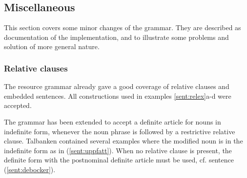 \documentclass{report}
\begin{document}
%


\subsection{Miscellaneous}
This section covers some minor changes of the grammar.
They are described
as documentation of the implementation, and to illustrate some problems
and solution of more general nature.
\subsubsection{Relative clauses}
The resource grammar already gave a good coverage of relative clauses and embedded sentences.
All constructions used in examples \ref{sent:relex}a-d were accepted.
\label{sent:relex} %

The grammar has been extended to accept a definite article for
nouns in indefinite form, whenever the noun phrase is followed by a restrictive
relative clause.
Talbanken contained several examples where the modified noun is in the 
indefinite form as in (\ref{sent:uppfatt}).
\label{sent:uppfatt}
When no relative clause is present, the definite form with the postnominal
definite article must be used, cf.
sentence (\ref{sent:debocker}).
\label{sent:debocker}
\end{document}

